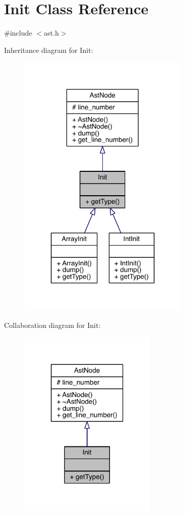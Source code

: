 \hypertarget{class_init}{}\section{Init Class Reference}
\label{class_init}


{\ttfamily \#include $<$ast.\+h$>$}



Inheritance diagram for Init\+:\nopagebreak
\begin{figure}[H]
\begin{center}
\leavevmode
\includegraphics[width=232pt]{class_init__inherit__graph}
\end{center}
\end{figure}


Collaboration diagram for Init\+:\nopagebreak
\begin{figure}[H]
\begin{center}
\leavevmode
\includegraphics[width=186pt]{class_init__coll__graph}
\end{center}
\end{figure}
